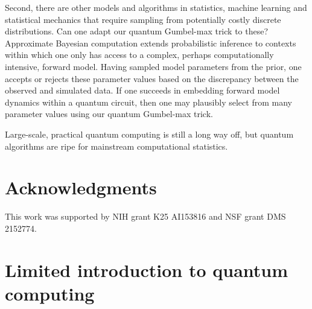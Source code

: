 \documentclass[12pt]{article} %
\begin{document}
Second, there are other models and algorithms in statistics, machine learning and statistical mechanics that require sampling from potentially costly discrete distributions.   Can one adapt  our quantum Gumbel-max trick to these?  Approximate Bayesian computation \citep{csillery2010approximate} extends probabilistic inference to contexts within which one only has access to a complex, perhaps computationally intensive, forward model.  Having sampled model parameters from the prior, one accepts or rejects these parameter values based on the discrepancy between the observed and simulated data.  If one succeeds in embedding forward model dynamics within a quantum circuit, then one may plausibly select from many parameter values using our quantum Gumbel-max trick. 

Large-scale, practical quantum computing is still a long way off, but quantum algorithms are ripe for mainstream computational statistics.





\section*{Acknowledgments}

This work was supported by NIH grant K25 AI153816 and NSF grant DMS 2152774.

\appendix

\section{Limited introduction to quantum computing}\label{sec:shortIntro}
\end{document}
